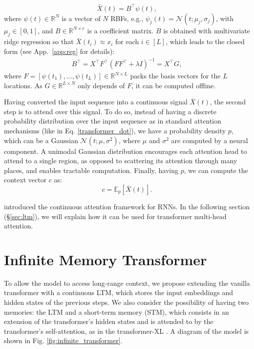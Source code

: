 \documentclass[11pt]{article}
\begin{document}
\begin{equation}\label{eq:continuous_embeddings}
    \bar{X}(t)=B^\top \psi(t),
\end{equation}
where ${\psi(t) \in \mathbb{R}^N}$ is a vector of $N$ RBFs, e.g., $\psi_j(t) = \mathcal{N}(t; \mu_j, \sigma_j)$, with $\mu_j \in [0,1]$, and ${B \in \mathbb{R}^{N\times e}}$ is a coefficient matrix. $B$ is obtained with %
multivariate ridge regression %
\citep{brown1980adaptive} so that ${\bar{X}(t_i) \approx x_i}$ for each $i \in [L]$, which leads to the closed form (see App.~\ref{app:reg} for details):
\begin{align}\label{eq:B}
    B^\top = X^\top F^\top (FF^\top + \lambda I)^{-1} = X^\top G,
\end{align}
where ${F=[\psi(t_1),\dots,\psi(t_L)]\in \mathbb{R}^{ N\times L}}$ packs the basis vectors for the $L$ locations. As ${G \in \mathbb{R}^{L\times N}}$ only depends of $F$, it can be computed offline.

Having converted the input sequence into a continuous signal $\bar{X}(t)$, the second step is to attend over this signal. To do so, instead of having a discrete probability distribution over the input sequence as in standard attention mechanisms (like in Eq. \ref{transformer_dot}), we have a probability density $p$, which can be a Gaussian ${\mathcal{N}(t; \mu, \sigma^2)}$, where $\mu$ and $\sigma^2$ are computed by a neural component. A unimodal Gaussian distribution encourages each attention head to attend to a single region, as opposed to scattering its attention through many places, and enables tractable computation.
Finally, having $p$, we can compute the context vector $c$ as:
\begin{equation}
\label{eq:context}
c=\mathbb{E}_{p}\left[\bar{X}(t)\right].
\end{equation}

\citet{martins2020sparse} introduced the continuous attention framework for RNNs. In the following section (\S\ref{sec:ltm}), we will explain how it can be used for transformer multi-head attention.

\section{Infinite Memory Transformer}
To allow the model to access long-range context, we propose extending the vanilla transformer with a continuous LTM, which stores the input embeddings and hidden states of the previous steps. 
We also consider the possibility of having two memories: the LTM and a short-term memory (STM), which consists in an extension of the transformer's hidden states and is attended to by the transformer's self-attention, as in the transformer-XL \citep{dai2019transformer}.
A diagram of the model is shown in Fig. \ref{fig:infinite_transformer}. 
\end{document}
